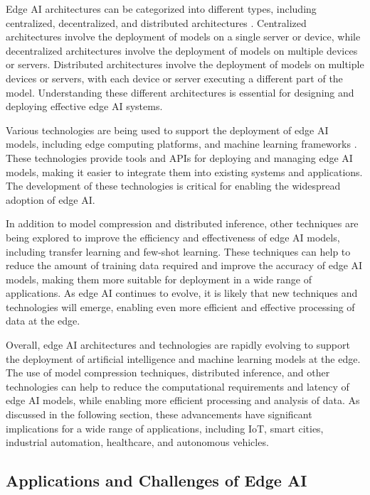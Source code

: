 \documentclass[11pt]{article}
\begin{document}
Edge AI architectures can be categorized into different types, including centralized, decentralized, and distributed architectures \cite{ref96}. Centralized architectures involve the deployment of models on a single server or device, while decentralized architectures involve the deployment of models on multiple devices or servers. Distributed architectures involve the deployment of models on multiple devices or servers, with each device or server executing a different part of the model. Understanding these different architectures is essential for designing and deploying effective edge AI systems.

Various technologies are being used to support the deployment of edge AI models, including edge computing platforms, and machine learning frameworks \cite{ref84}. These technologies provide tools and APIs for deploying and managing edge AI models, making it easier to integrate them into existing systems and applications. The development of these technologies is critical for enabling the widespread adoption of edge AI.

In addition to model compression and distributed inference, other techniques are being explored to improve the efficiency and effectiveness of edge AI models, including transfer learning and few-shot learning. These techniques can help to reduce the amount of training data required and improve the accuracy of edge AI models, making them more suitable for deployment in a wide range of applications. As edge AI continues to evolve, it is likely that new techniques and technologies will emerge, enabling even more efficient and effective processing of data at the edge.

Overall, edge AI architectures and technologies are rapidly evolving to support the deployment of artificial intelligence and machine learning models at the edge. The use of model compression techniques, distributed inference, and other technologies can help to reduce the computational requirements and latency of edge AI models, while enabling more efficient processing and analysis of data. As discussed in the following section, these advancements have significant implications for a wide range of applications, including IoT, smart cities, industrial automation, healthcare, and autonomous vehicles.

\subsection{Applications and Challenges of Edge AI}
\end{document}
